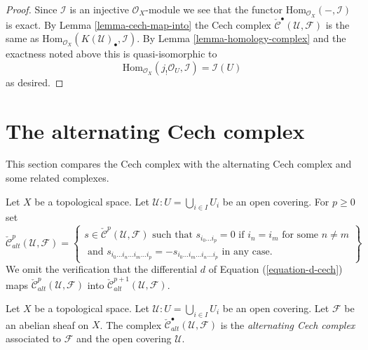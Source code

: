 \begin{proof}
Since $\mathcal{I}$ is an injective $\mathcal{O}_X$-module we see
that the functor $\text{Hom}_{\mathcal{O}_X}(-, \mathcal{I})$
is exact. By Lemma \ref{lemma-cech-map-into}
the Cech complex $\check{\mathcal{C}}^\bullet(\mathcal{U}, \mathcal{F})$
is the same as
$\text{Hom}_{\mathcal{O}_X}(K(\mathcal{U})_\bullet, \mathcal{I})$.
By Lemma \ref{lemma-homology-complex} and the exactness noted above this
is quasi-isomorphic to 
$$
\text{Hom}_{\mathcal{O}_X}(j_!\mathcal{O}_U, \mathcal{I}) =
\mathcal{I}(U)
$$
as desired.
\end{proof}









\section{The alternating Cech complex}
\label{section-alternating-cech}

\noindent
This section compares the Cech complex with the alternating Cech
complex and some related complexes.

\medskip\noindent
Let $X$ be a topological space. Let $\mathcal{U} : U = \bigcup_{i \in I} U_i$
be an open covering. For $p \geq 0$ set
$$
\check{\mathcal{C}}_{alt}^p(\mathcal{U}, \mathcal{F})
=
\left\{
\begin{matrix}
s \in  \check{\mathcal{C}}^p(\mathcal{U}, \mathcal{F})
\text{ such that }
s_{i_0 \ldots i_p} = 0 \text{ if } i_n = i_m \text{ for some } n \not = m\\
\text{ and }
s_{i_0\ldots i_n \ldots i_m \ldots i_p}
=
-s_{i_0\ldots i_m \ldots i_n \ldots i_p}
\text{ in any case.}
\end{matrix}
\right\}
$$
We omit the verification that the differential $d$ of
Equation (\ref{equation-d-cech}) maps
$\check{\mathcal{C}}^p_{alt}(\mathcal{U}, \mathcal{F})$ into 
$\check{\mathcal{C}}^{p + 1}_{alt}(\mathcal{U}, \mathcal{F})$.

\begin{definition}
\label{definition-alternating-cech-complex}
Let $X$ be a topological space. Let $\mathcal{U} : U = \bigcup_{i \in I} U_i$
be an open covering. Let $\mathcal{F}$ be an abelian sheaf on $X$.
The complex $\check{\mathcal{C}}_{alt}^\bullet(\mathcal{U}, \mathcal{F})$
is the {\it alternating Cech complex} associated to $\mathcal{F}$ and the
open covering $\mathcal{U}$.
\end{definition}

